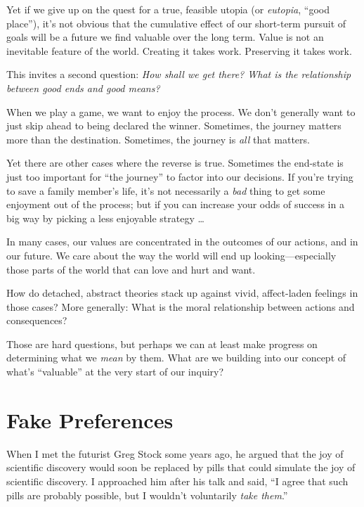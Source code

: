 {
 Yet if we give up on the quest for a true, feasible utopia (or
\textit{eutopia}, ``good place''),
it's not obvious that the cumulative effect of our
short-term pursuit of goals will be a future we find valuable over the
long term. Value is not an inevitable feature of the world. Creating it
takes work. Preserving it takes work.}

{
 This invites a second question: \textit{How shall we get there?
What is the relationship between good ends and good means?}}

{
 When we play a game, we want to enjoy the process. We
don't generally want to just skip ahead to being
declared the winner. Sometimes, the journey matters more than the
destination. Sometimes, the journey is \textit{all} that matters.}

{
 Yet there are other cases where the reverse is true. Sometimes the
end-state is just too important for ``the
journey'' to factor into our decisions. If
you're trying to save a family member's
life, it's not necessarily a \textit{bad} thing to get
some enjoyment out of the process; but if you can increase your odds of
success in a big way by picking a less enjoyable strategy \ldots}

{
 In many cases, our values are concentrated in the outcomes of our
actions, and in our future. We care about the way the world will end up
looking---especially those parts of the world that can love and hurt
and want.}

{
 How do detached, abstract theories stack up against vivid,
affect-laden feelings in those cases? More generally: What is the moral
relationship between actions and consequences?}

{
 Those are hard questions, but perhaps we can at least make
progress on determining what we \textit{mean} by them. What are we
building into our concept of what's
``valuable'' at the very start of
our inquiry?}

\myendsectiontext

\chapter{Fake Preferences}


{
 When I met the futurist Greg Stock some years ago, he argued that
the joy of scientific discovery would soon be replaced by pills that
could simulate the joy of scientific discovery. I approached him after
his talk and said, ``I agree that such pills are
probably possible, but I wouldn't voluntarily
\textit{take them}.'' }

